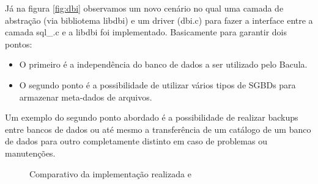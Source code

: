 Já na figura \ref{fig:dbi} observamos um novo cenário no qual uma camada de abstração (via bibliotema libdbi) e um driver (dbi.c) para fazer a interface entre a camada sql\_\*.c e a libdbi foi implementado. Basicamente para garantir dois pontos: 
\begin{itemize}
\item O primeiro é a independência do banco de dados a ser utilizado pelo Bacula. 
\item O segundo ponto é a possibilidade de utilizar vários tipos de SGBDs para armazenar meta-dados de arquivos.                                                                   \end{itemize}
Um exemplo do segundo ponto abordado é a possibilidade de realizar backups entre bancos de dados ou até mesmo a transferência de um catálogo de um banco de dados para outro completamente distinto em caso de problemas ou manutenções.

\begin{figure}[h]
 \centerline{
  \hfil
 } 
 \label{fig:comparativo}
 \caption[Comparativo de implementação]{Comparativo da implementação realizada  e }
\end{figure}

